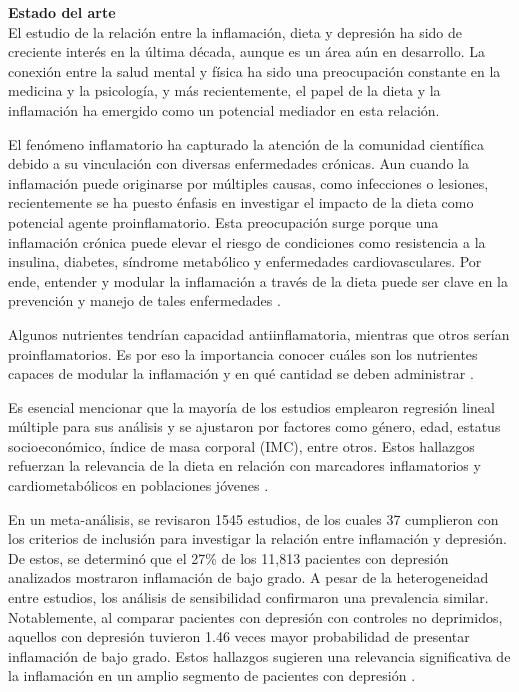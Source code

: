 \documentclass[jou]{apa7}
\begin{document}
	\textbf{Estado del arte}\\
	
	El estudio de la relación entre la inflamación, dieta y depresión ha
	sido de creciente interés en la última década, aunque es un área aún en
	desarrollo. La conexión entre la salud mental y física ha sido una
	preocupación constante en la medicina y la psicología, y más
	recientemente, el papel de la dieta y la inflamación ha emergido como un
	potencial mediador en esta relación.
	
	El fenómeno inflamatorio ha capturado la atención de la comunidad
	científica debido a su vinculación con diversas enfermedades crónicas.
	Aun cuando la inflamación puede originarse por múltiples causas, como
	infecciones o lesiones, recientemente se ha puesto énfasis en investigar
	el impacto de la dieta como potencial agente proinflamatorio. Esta
	preocupación surge porque una inflamación crónica puede elevar el riesgo
	de condiciones como resistencia a la insulina, diabetes, síndrome
	metabólico y enfermedades cardiovasculares. Por ende, entender y modular
	la inflamación a través de la dieta puede ser clave en la prevención y
	manejo de tales enfermedades \parencites{daneshLowGradeInflammation2000}{ridkerHighsensitivityCreactiveProtein2004}{salas-salvadoConjugatedLinoleicAcid2006}.
	
	Algunos nutrientes tendrían capacidad antiinflamatoria, mientras que
	otros serían proinflamatorios. Es por eso la importancia conocer cuáles
	son los nutrientes capaces de modular la inflamación y en qué cantidad
	se deben administrar \parencite{giuglianoMetabolicCardiovascularEffects1997}.
	
	Es esencial mencionar que la mayoría de los estudios emplearon regresión
	lineal múltiple para sus análisis y se ajustaron por factores como
	género, edad, estatus socioeconómico, índice de masa corporal (IMC),
	entre otros. Estos hallazgos refuerzan la relevancia de la dieta en
	relación con marcadores inflamatorios y cardiometabólicos en poblaciones
	jóvenes \parencite{cotaCardiometabolicRiskHealth2021}.
	
	En un meta-análisis, se revisaron 1545 estudios, de los cuales 37
	cumplieron con los criterios de inclusión para investigar la relación
	entre inflamación y depresión. De estos, se determinó que el 27\% de los
	11,813 pacientes con depresión analizados mostraron inflamación de bajo
	grado. A pesar de la heterogeneidad entre estudios, los análisis de
	sensibilidad confirmaron una prevalencia similar. Notablemente, al
	comparar pacientes con depresión con controles no deprimidos, aquellos
	con depresión tuvieron 1.46 veces mayor probabilidad de presentar
	inflamación de bajo grado. Estos hallazgos sugieren una relevancia
	significativa de la inflamación en un amplio segmento de pacientes con
	depresión \parencite{Osimo2019}.
	
\end{document}
